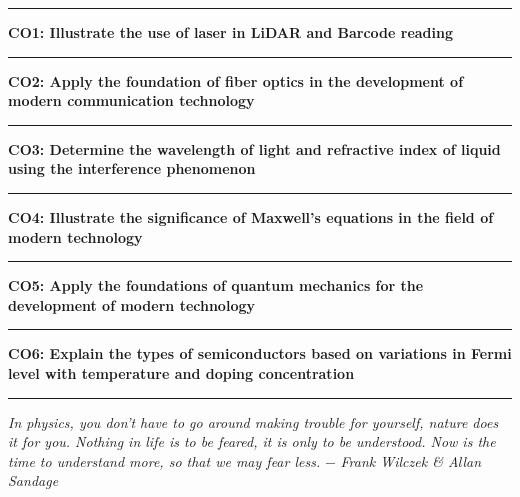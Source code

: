 \documentclass{article}
\begin{document}
\vspace{0.5cm}
\begin{center}
\hrule
\vspace{0.5cm}
\textbf{ \large CO1: Illustrate the use of laser in LiDAR and Barcode reading } 
\vspace{0.5cm}

\hrule

\vspace{0.5cm}
\textbf{ \large CO2: Apply the foundation of fiber optics in the development of modern communication technology } 
\vspace{0.5cm}

\hrule

\vspace{0.5cm}
\textbf{ \large CO3: Determine the wavelength of light and refractive index of liquid using the interference phenomenon} 
\vspace{0.5cm}

\hrule

\vspace{0.5cm}
\textbf{ \large CO4: Illustrate the significance of Maxwell's equations in the field of modern technology} 
\vspace{0.5cm}

\hrule

\vspace{0.5cm}
\textbf{ \large CO5: Apply the foundations of quantum mechanics for the development of modern technology} 
\vspace{0.5cm}

\hrule

\vspace{0.5cm}
\textbf{  \large CO6: Explain the types of semiconductors based on variations in Fermi level with temperature and doping concentration} 
\vspace{0.5cm}
\hrule
\end{center}

\vspace{1.5cm}

\textit{In physics, you don't have to go around making trouble for yourself, nature does it for you. Nothing in life is to be feared, it is only to be understood.  Now is the time to understand more, so that we may fear less.}  \hfil $-$ \textit{Frank Wilczek \& Allan Sandage}

\textit{
}
\end{document}
